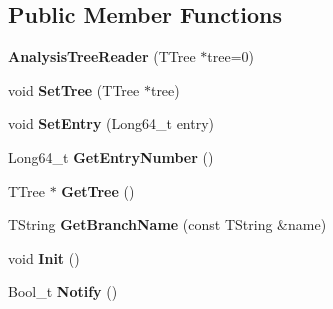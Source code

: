 \subsection*{Public Member Functions}
\begin{DoxyCompactItemize}
\item 
\hypertarget{class_h_a_l_1_1_analysis_tree_reader_ac00ba35d0b860566482e32c1dfd04827}{{\bfseries Analysis\+Tree\+Reader} (T\+Tree $\ast$tree=0)}\label{class_h_a_l_1_1_analysis_tree_reader_ac00ba35d0b860566482e32c1dfd04827}

\item 
\hypertarget{class_h_a_l_1_1_analysis_tree_reader_a031181c782d3620d271a92cef995d998}{void {\bfseries Set\+Tree} (T\+Tree $\ast$tree)}\label{class_h_a_l_1_1_analysis_tree_reader_a031181c782d3620d271a92cef995d998}

\item 
\hypertarget{class_h_a_l_1_1_analysis_tree_reader_a1a9c8bc30141df5fab1163f006fb08e3}{void {\bfseries Set\+Entry} (Long64\+\_\+t entry)}\label{class_h_a_l_1_1_analysis_tree_reader_a1a9c8bc30141df5fab1163f006fb08e3}

\item 
\hypertarget{class_h_a_l_1_1_analysis_tree_reader_a6fcf94a452ec53b66d9e0e49062d4e44}{Long64\+\_\+t {\bfseries Get\+Entry\+Number} ()}\label{class_h_a_l_1_1_analysis_tree_reader_a6fcf94a452ec53b66d9e0e49062d4e44}

\item 
\hypertarget{class_h_a_l_1_1_analysis_tree_reader_a6ad8933bd6c8cc2b17179c96fd3bfcb1}{T\+Tree $\ast$ {\bfseries Get\+Tree} ()}\label{class_h_a_l_1_1_analysis_tree_reader_a6ad8933bd6c8cc2b17179c96fd3bfcb1}

\item 
\hypertarget{class_h_a_l_1_1_analysis_tree_reader_a85f301e0ef78fdf1f239b36a030fb023}{T\+String {\bfseries Get\+Branch\+Name} (const T\+String \&name)}\label{class_h_a_l_1_1_analysis_tree_reader_a85f301e0ef78fdf1f239b36a030fb023}

\item 
\hypertarget{class_h_a_l_1_1_analysis_tree_reader_ab17ea6c10da56d9282d60d9507e01ef9}{void {\bfseries Init} ()}\label{class_h_a_l_1_1_analysis_tree_reader_ab17ea6c10da56d9282d60d9507e01ef9}

\item 
\hypertarget{class_h_a_l_1_1_analysis_tree_reader_adfe7aa4110b150fb1c7e80580a775a82}{Bool\+\_\+t {\bfseries Notify} ()}\label{class_h_a_l_1_1_analysis_tree_reader_adfe7aa4110b150fb1c7e80580a775a82}


\end{DoxyCompactItemize}
